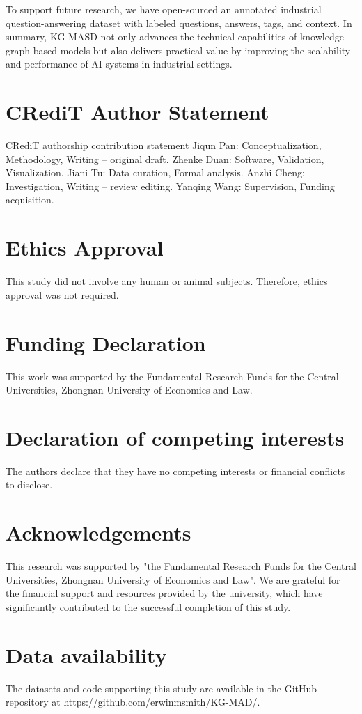 \documentclass[preprint,12pt]{elsarticle}
\begin{document}
To support future research, we have open-sourced an annotated industrial question-answering dataset with labeled questions, answers, tags, and context. In summary, KG-MASD not only advances the technical capabilities of knowledge graph-based models but also delivers practical value by improving the scalability and performance of AI systems in industrial settings.

\section*{CRediT Author Statement}
CRediT authorship contribution statement
Jiqun Pan: Conceptualization, Methodology, Writing – original draft. 
Zhenke Duan: Software, Validation, Visualization. 
Jiani Tu: Data curation, Formal analysis. 
Anzhi Cheng: Investigation, Writing – review  editing. 
Yanqing Wang: Supervision, Funding acquisition.


\section*{Ethics Approval}
This study did not involve any human or animal subjects. Therefore, ethics approval was not required.

\section*{Funding Declaration}
This work was supported by the Fundamental Research Funds for the Central Universities, Zhongnan University of Economics and Law.

\section*{Declaration of competing interests}
The authors declare that they have no competing interests or financial conflicts to disclose.

\section*{Acknowledgements}
This research was supported by "the Fundamental Research Funds for the Central Universities, Zhongnan University of Economics and Law". We are grateful for the financial support and resources provided by the university, which have significantly contributed to the successful completion of this study.

\section*{Data availability}
The datasets and code supporting this study are available in the GitHub repository at https://github.com/erwinmsmith/KG-MAD/.
\end{document}
